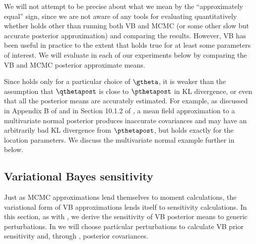 \documentclass{article}\usepackage[]{graphicx}\usepackage[]{color}
\theoremstyle{plain}
\theoremstyle{definition}
\theoremstyle{plain}
\theoremstyle{plain}
\theoremstyle{plain}
\theoremstyle{plain}
\begin{document}
We will not attempt to be precise about what we mean by the ``approximately
equal'' sign, since we are not aware of any tools for evaluating
quantitatively whether  holds other than
running both VB and MCMC (or some other slow but accurate posterior
approximation) and comparing the results. However, VB has been useful
in practice to the extent that  holds
true for at least some parameters of interest. We will evaluate 
in each of our experiments below by comparing the VB and MCMC posterior
approximate means. 

Since  holds only for a particular choice
of $\gtheta$, it is weaker than the assumption that $\qthetapost$
is close to $\pthetapost$ in KL divergence, or even that all the
posterior means are accurately estimated. For example, as discussed
in Appendix B of \citet{giordano:2015:lrvb} and in Section 10.1.2
of \citet{bishop:2006:pattern}, a mean field approximation to a multivariate
normal posterior produces inaccurate covariances and may have an arbitrarily
bad KL divergence from $\pthetapost$, but 
holds exactly for the location parameters. We discuss the multivariate
normal example further in  below.

\subsection{Variational Bayes sensitivity\label{subsec:vb_sensitivity} }

Just as MCMC approximations lend themselves to moment calculations,
the variational form of VB approximations lends itself to sensitivity
calculations. In this section, as with ,
we derive the sensitivity of VB posterior means to generic perturbations.
In  we will choose particular
perturbations to calculate VB prior sensitivity and, through ,
posterior covariances.
\end{document}
